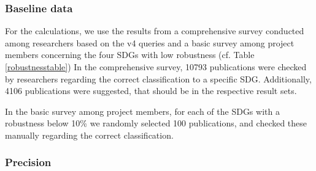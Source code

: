 \documentclass{article}
\begin{document}
\subsubsection{Baseline data}
 
For the calculations, we use the results from a comprehensive survey conducted among researchers based on the v4 queries \cite{vanderfeesten_survey_2020} and a basic survey among project members concerning the four SDGs with low robustness (cf. Table \ref{robustnesstable})
In the comprehensive survey, 10793 publications were checked by researchers regarding the correct classification to a specific SDG. Additionally, 4106 publications were suggested, that should be in the respective result sets.

In the basic survey among project members, for each of the SDGs with a robustness below 10\% we randomly selected 100 publications, and checked these manually regarding the correct classification.

\subsubsection{Precision}
\end{document}

